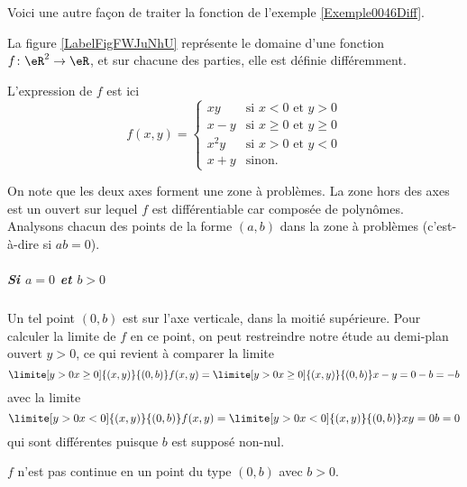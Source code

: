Voici une autre façon de traiter la fonction de l'exemple \ref{Exemple0046Diff}.

\begin{example} \label{ExeFHmCLII}
    La figure \ref{LabelFigFWJuNhU} représente le domaine d'une fonction $f\colon \eR^2\to \eR$, et sur chacune des parties, elle est définie différemment.
    \newcommand{\CaptionFigFWJuNhU}{La fonction de l'exemple \ref{ExeFHmCLII}.}


L'expression de $f$ est ici
\begin{equation}
  f(x,y) =
  \begin{cases}
      xy & \text{si } x < 0 \text{ et } y > 0\\
      x-y & \text{si } x \geq 0 \text{ et } y \geq 0\\
      x^2y & \text{si } x > 0 \text{ et } y < 0\\
    x+y & \text{sinon.}
  \end{cases}
\end{equation}

On note que les deux axes forment une zone à problèmes. La zone hors
des axes est un ouvert sur lequel $f$ est différentiable car composée
de polynômes. Analysons chacun des points de la forme $(a,b)$ dans la
zone à problèmes (c'est-à-dire si $ab = 0$).

\subparagraph{Si $a = 0$ et $b > 0$} Un tel point $(0,b)$ est sur
l'axe verticale, dans la moitié supérieure. Pour calculer la limite de
$f$ en ce point, on peut restreindre notre étude au demi-plan ouvert
$y > 0$, ce qui revient à comparer la limite
\begin{equation*}
  \limite[y>0\\x\geq 0] {(x,y)} {(0,b)} f(x,y) =   \limite[y>0\\x\geq
  0] {(x,y)} {(0,b)} x-y = 0 - b = -b
\end{equation*}
avec la limite
\begin{equation*}
  \limite[y>0\\x<0] {(x,y)} {(0,b)} f(x,y) =   \limite[y>0\\x<0]
  {(x,y)} {(0,b)} xy = 0 b = 0
\end{equation*}
qui sont différentes puisque $b$ est supposé non-nul.

\conclusion $f$ n'est pas continue en un point du type $(0,b)$ avec $b
> 0$.


\end{example}
